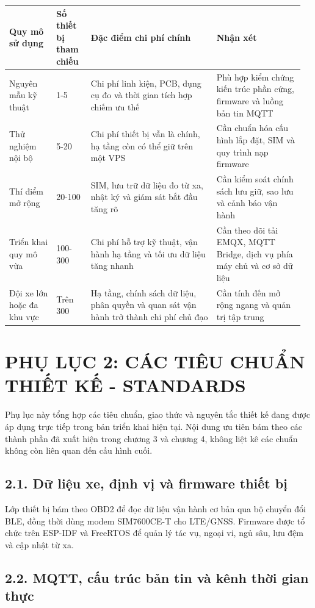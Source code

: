 \documentclass[a4paper]{extarticle}
\newcounter{none} %
\newcommand{\appendixsection}[1]{\clearpage\section{#1}}
\begin{document}
{\def\LTcaptype{none} %
\begin{longtable}{|L{0.150\linewidth}|L{0.115\linewidth}|L{0.405\linewidth}|L{0.290\linewidth}|}
\hline
\textbf{Quy mô sử dụng} & \textbf{Số thiết bị tham chiếu} & \textbf{Đặc điểm chi phí chính} & \textbf{Nhận xét} \\
\hline
\endhead
\endfoot
\endlastfoot
Nguyên mẫu kỹ thuật & 1-5 & Chi phí linh kiện, PCB, dụng cụ đo và thời gian tích hợp chiếm ưu thế & Phù hợp kiểm chứng kiến trúc phần cứng, firmware và luồng bản tin MQTT \\\hline
Thử nghiệm nội bộ & 5-20 & Chi phí thiết bị vẫn là chính, hạ tầng còn có thể giữ trên một VPS & Cần chuẩn hóa cấu hình lắp đặt, SIM và quy trình nạp firmware \\\hline
Thí điểm mở rộng & 20-100 & SIM, lưu trữ dữ liệu đo từ xa, nhật ký và giám sát bắt đầu tăng rõ & Cần kiểm soát chính sách lưu giữ, sao lưu và cảnh báo vận hành \\\hline
Triển khai quy mô vừa & 100-300 & Chi phí hỗ trợ kỹ thuật, vận hành hạ tầng và tối ưu dữ liệu tăng nhanh & Cần theo dõi tải EMQX, MQTT Bridge, dịch vụ phía máy chủ và cơ sở dữ liệu \\\hline
Đội xe lớn hoặc đa khu vực & Trên 300 & Hạ tầng, chính sách dữ liệu, phân quyền và quan sát vận hành trở thành chi phí chủ đạo & Cần tính đến mở rộng ngang và quản trị tập trung \\\hline
\end{longtable}
}


\appendixsection{PHỤ LỤC 2: CÁC TIÊU CHUẨN THIẾT KẾ - STANDARDS}

Phụ lục này tổng hợp các tiêu chuẩn, giao thức và nguyên tắc thiết kế đang được
áp dụng trực tiếp trong bản triển khai hiện tại. Nội dung ưu tiên bám theo các
thành phần đã xuất hiện trong chương 3 và chương 4, không liệt kê các chuẩn
không còn liên quan đến cấu hình cuối.

\subsection{2.1. Dữ liệu xe, định vị và firmware thiết bị}\label{app2-vehicle-firmware-standards}

Lớp thiết bị bám theo OBD2 để đọc dữ liệu vận hành cơ bản qua bộ chuyển đổi BLE,
đồng thời dùng modem SIM7600CE-T cho LTE/GNSS. Firmware được tổ chức trên
ESP-IDF và FreeRTOS để quản lý tác vụ, ngoại vi, ngủ sâu, lưu đệm và cập nhật
từ xa.

\subsection{2.2. MQTT, cấu trúc bản tin và kênh thời gian thực}\label{app2-mqtt-realtime-standards}
\end{document}
